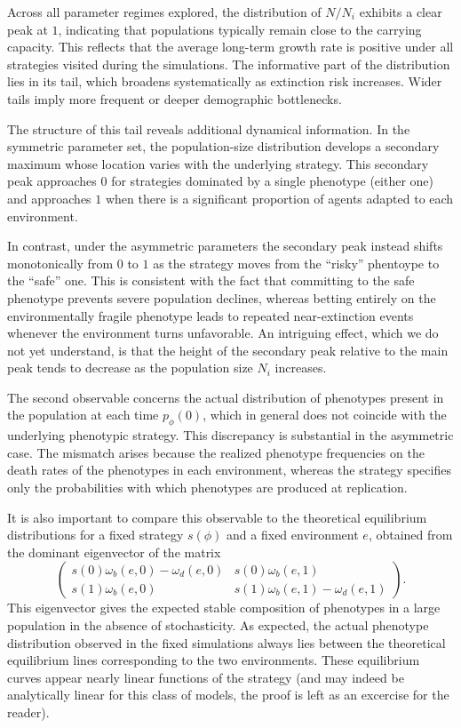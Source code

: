 \documentclass[a4paper,10pt,twocolumn]{article}
\begin{document}
Across all parameter regimes explored, the distribution of $N/N_i$ exhibits a clear peak at $1$, indicating that populations typically remain close to the carrying capacity. This reflects that the average long-term growth rate is positive under all strategies visited during the simulations. The informative part of the distribution lies in its tail, which broadens systematically as extinction risk increases. Wider tails imply more frequent or deeper demographic bottlenecks.

The structure of this tail reveals additional dynamical information. In the symmetric parameter set, the population-size distribution develops a secondary maximum whose location varies with the underlying strategy. This secondary peak approaches $0$ for strategies dominated by a single phenotype (either one) and approaches $1$ when there is a significant proportion of agents adapted to each environment.

In contrast, under the asymmetric parameters the secondary peak instead shifts monotonically from $0$ to $1$ as the strategy moves from the ``risky'' phentoype to the ``safe'' one. This is consistent with the fact that committing to the safe phenotype prevents severe population declines, whereas betting entirely on the environmentally fragile phenotype leads to repeated near-extinction events whenever the environment turns unfavorable. An intriguing effect, which we do not yet understand, is that the height of the secondary peak relative to the main peak tends to decrease as the population size $N_i$ increases.

The second observable concerns the actual distribution of phenotypes present in the population at each time $p_{\phi}(0)$, which in general does not coincide with the underlying phenotypic strategy. This discrepancy is substantial in the asymmetric case. The mismatch arises because the realized phenotype frequencies on the death rates of the phenotypes in each environment, whereas the strategy specifies only the probabilities with which phenotypes are produced at replication.

It is also important to compare this observable to the theoretical equilibrium distributions for a fixed strategy $s(\phi)$ and a fixed environment $e$, obtained from the dominant eigenvector of the matrix
\begin{equation} \label{eq:equilibrium_matrix}
    \begin{pmatrix}s(0)\omega_b(e,0)-\omega_d(e,0)&s(0)\omega_b(e,1)\\s(1)\omega_b(e,0)&s(1)\omega_b(e,1)-\omega_d(e,1)\end{pmatrix}.
\end{equation}
This eigenvector gives the expected stable composition of phenotypes in a large population in the absence of stochasticity. As expected, the actual phenotype distribution observed in the fixed simulations always lies between the theoretical equilibrium lines corresponding to the two environments. These equilibrium curves appear nearly linear functions of the strategy (and may indeed be analytically linear for this class of models, the proof is left as an excercise for the reader).
\end{document}
